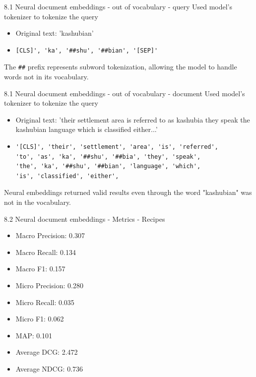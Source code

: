 \documentclass{beamer}
\begin{document}
\begin{frame}[fragile]{8.1 Neural document embeddings - out of vocabulary - query}
  Used model's tokenizer to tokenize the query
  \begin{itemize}
    \item Original text: 'kashubian'
    \item \begin{verbatim}[CLS]', 'ka', '##shu', '##bian', '[SEP]'\end{verbatim}
  \end{itemize}
  The \verb|##| prefix represents subword tokenization, allowing the model to handle words not in its vocabulary.
\end{frame}
\begin{frame}[fragile]{8.1 Neural document embeddings - out of vocabulary - document}
  Used model's tokenizer to tokenize the query
  \begin{itemize}
    \item Original text: 'their settlement area is referred to as kashubia they speak the kashubian language which is classified either...'
    \item \begin{verbatim}
'[CLS]', 'their', 'settlement', 'area', 'is', 'referred',
'to', 'as', 'ka', '##shu', '##bia', 'they', 'speak',
'the', 'ka', '##shu', '##bian', 'language', 'which',
'is', 'classified', 'either',\end{verbatim}
  \end{itemize}
  Neural embeddings returned valid results even through the word "kashubian" was not in the vocabulary.
\end{frame}

\begin{frame}{8.2 Neural document embeddings - Metrics - Recipes}
  \begin{itemize}
    \item Macro Precision: 0.307
    \item Macro Recall: 0.134
    \item Macro F1: 0.157
    \item Micro Precision: 0.280
    \item Micro Recall: 0.035
    \item Micro F1: 0.062
    \item MAP: 0.101
    \item Average DCG: 2.472
    \item Average NDCG: 0.736
  \end{itemize}
\end{frame}
\end{document}

